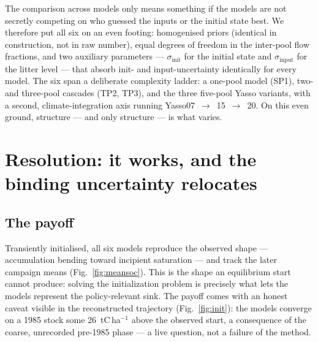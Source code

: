\documentclass[11pt]{article}
\newcommand{\sinit}{\sigma_{\mathrm{init}}}
\newcommand{\sinput}{\sigma_{\mathrm{input}}}
\begin{document}
The comparison across models only means something if the models are not secretly competing on who guessed the inputs
or the initial state best. We therefore put all six on an even footing: homogenised priors (identical in
construction, not in raw number), equal degrees of freedom in the inter-pool flow fractions, and two auxiliary
parameters --- $\sinit$ for the initial state and $\sinput$ for the litter level --- that absorb init- and
input-uncertainty identically for every model. The six span a deliberate complexity ladder: a one-pool model (SP1),
two- and three-pool cascades (TP2, TP3), and the three five-pool Yasso variants, with a second, climate-integration
axis running Yasso07~$\to$~15~$\to$~20. On this even ground, structure --- and only structure --- is what varies.

\section{Resolution: it works, and the binding uncertainty relocates}

\subsection{The payoff}
Transiently initialised, all six models reproduce the observed shape --- accumulation bending toward incipient
saturation --- and track the later campaign means (Fig.~\ref{fig:meansoc}). This is the shape an equilibrium start
cannot produce: solving the initialization problem is precisely what lets the models represent the policy-relevant
sink. The payoff comes with an honest caveat visible in the reconstructed trajectory
(Fig.~\ref{fig:init}): the models converge on a 1985 stock some 26~tC\,ha$^{-1}$ above the observed start, a
consequence of the coarse, unrecorded pre-1985 phase --- a live question, not a failure of the method.
\end{document}
